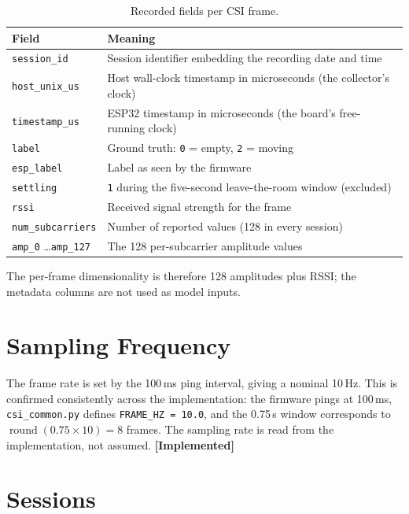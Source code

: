 \documentclass[11pt,a4paper,oneside]{report}
\newcommand{\evidencetag}[2]{{\small\sffamily\bfseries\textcolor{#1}{[#2]}}}
\newcommand{\Impl}{\evidencetag{good}{Implemented}}
\newcommand{\code}[1]{\texttt{\small #1}}
\begin{document}
\begin{table}[H]
\centering
\caption{Recorded fields per CSI frame.}
\renewcommand{\arraystretch}{1.25}
\begin{tabularx}{\linewidth}{|l|X|}
\hline
\textbf{Field} & \textbf{Meaning} \\
\hline
\code{session\_id}      & Session identifier embedding the recording date and time \\
\hline
\code{host\_unix\_us}   & Host wall-clock timestamp in microseconds (the collector's clock) \\
\hline
\code{timestamp\_us}    & ESP32 timestamp in microseconds (the board's free-running clock) \\
\hline
\code{label}            & Ground truth: \code{0} = empty, \code{2} = moving \\
\hline
\code{esp\_label}       & Label as seen by the firmware \\
\hline
\code{settling}         & \code{1} during the five-second leave-the-room window (excluded) \\
\hline
\code{rssi}             & Received signal strength for the frame \\
\hline
\code{num\_subcarriers} & Number of reported values (128 in every session) \\
\hline
\code{amp\_0} \dots \code{amp\_127} & The 128 per-subcarrier amplitude values \\
\hline
\end{tabularx}
\end{table}
\noindent
The per-frame dimensionality is therefore 128 amplitudes plus RSSI; the
metadata columns are not used as model inputs.

\section{Sampling Frequency}

The frame rate is set by the 100\,ms ping interval, giving a nominal 10\,Hz.
This is confirmed consistently across the implementation: the firmware pings at
100\,ms, \code{csi\_common.py} defines \code{FRAME\_HZ = 10.0}, and the 0.75\,s
window corresponds to $\operatorname{round}(0.75 \times 10) = 8$ frames. The
sampling rate is read from the implementation, not assumed. \Impl

\section{Sessions}
\end{document}

